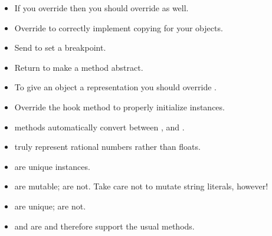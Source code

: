 \documentclass[a4paper,10pt,twoside]{book}
\begin{document}
\begin{itemize}

  \item If you override \ct{=} then you should override  as well.

  \item Override  to correctly implement copying for your objects.

  \item Send  to set a breakpoint.

  \item Return  to make a method abstract.

  \item To give an object a  representation you should override .

  \item Override the hook method  to properly initialize instances.

  \item {} methods automatically convert between ,  and .

  \item {} truly represent rational numbers rather than floats.

  \item {} are unique instances.

  \item {} are mutable;  are not.
  Take care not to mutate string literals, however!

  \item {} are unique;  are not.

  \item {} and  are  and therefore support the usual  methods.

\end{itemize}

\ifx\wholebook\relax\else
   
   
\end{document}
